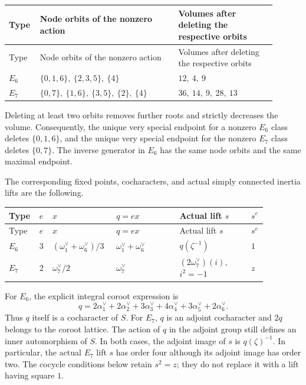 \documentclass[11pt,a4paper]{article}
\theoremstyle{definition}
\theoremstyle{remark}
\begin{document}
\begin{longtable}{@{}p{0.08\linewidth}p{0.48\linewidth}p{0.34\linewidth}@{}}
\toprule
Type & Node orbits of the nonzero action &
Volumes after deleting the respective orbits\\
\midrule
\endfirsthead
\toprule
Type & Node orbits of the nonzero action &
Volumes after deleting the respective orbits\\
\midrule
\endhead
\(E_6\) &
\(\{0,1,6\},\ \{2,3,5\},\ \{4\}\) & \(12,\ 4,\ 9\)\\
\(E_7\) &
\(\{0,7\},\ \{1,6\},\ \{3,5\},\ \{2\},\ \{4\}\) &
\(36,\ 14,\ 9,\ 28,\ 13\)\\
\bottomrule
\end{longtable}

Deleting at least two orbits removes further roots and strictly decreases
the volume. Consequently, the unique very special endpoint for a nonzero
\(E_6\) class deletes \(\{0,1,6\}\), and the unique very special endpoint
for the nonzero \(E_7\) class deletes \(\{0,7\}\).
The inverse generator in \(E_6\) has the same node orbits and the same
maximal endpoint.

The corresponding fixed points, cocharacters, and actual simply connected
inertia lifts are the following.

\begingroup
\small
\setlength{\tabcolsep}{2pt}
\begin{longtable}{@{}p{0.06\linewidth}p{0.04\linewidth}p{0.23\linewidth}p{0.23\linewidth}p{0.26\linewidth}p{0.05\linewidth}@{}}
\toprule
Type & \(e\) & \(x\) & \(q=ex\) & Actual lift \(s\) & \(s^e\)\\
\midrule
\endfirsthead
\toprule
Type & \(e\) & \(x\) & \(q=ex\) & Actual lift \(s\) & \(s^e\)\\
\midrule
\endhead
\(E_6\) & \(3\) &
\((\omega_1^\vee+\omega_6^\vee)/3\) &
\(\omega_1^\vee+\omega_6^\vee\) &
\(q(\zeta^{-1})\) & \(1\)\\
\(E_7\) & \(2\) &
\(\omega_7^\vee/2\) &
\(\omega_7^\vee\) &
\((2\omega_7^\vee)(i)\), \(i^2=-1\) & \(z\)\\
\bottomrule
\end{longtable}
\endgroup

For \(E_6\), the explicit integral coroot expression is
\begin{equation}\label{eq:ex-e6-q}
q=2\alpha_1^\vee+2\alpha_2^\vee+3\alpha_3^\vee
 +4\alpha_4^\vee+3\alpha_5^\vee+2\alpha_6^\vee.
\end{equation}
Thus \(q\) itself is a cocharacter of \(S\).
For \(E_7\), \(q\) is an adjoint cocharacter and \(2q\) belongs to the
coroot lattice. The action of \(q\) in the adjoint group still defines an
inner automorphism of \(S\). In both cases, the adjoint image of \(s\) is
\(q(\zeta)^{-1}\). In particular, the actual \(E_7\) lift \(s\) has order
four although its adjoint image has order two. The cocycle conditions below
retain \(s^2=z\); they do not replace it with a lift having square \(1\).
\end{document}
